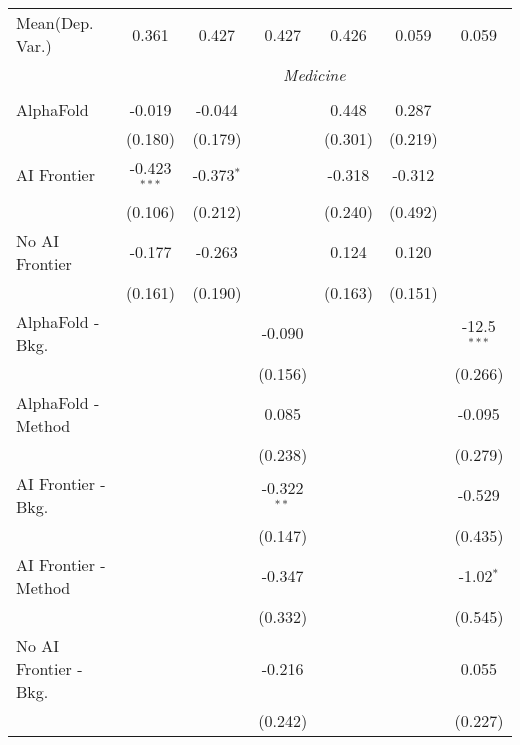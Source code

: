 \begin{tabular}{lcccccc}
Mean(Dep. Var.) & 0.361 & 0.427 & 0.427 & 0.426 & 0.059 & 0.059 \\
 & \multicolumn{6}{c}{\textit{Medicine}} \\ \\
   AlphaFold               & -0.019         & -0.044       &               & 0.448   & 0.287   &   \\   
                           & (0.180)        & (0.179)      &               & (0.301) & (0.219) &   \\   
   AI Frontier             & -0.423$^{***}$ & -0.373$^{*}$ &               & -0.318  & -0.312  &   \\   
                           & (0.106)        & (0.212)      &               & (0.240) & (0.492) &   \\   
   No AI Frontier          & -0.177         & -0.263       &               & 0.124   & 0.120   &   \\   
                           & (0.161)        & (0.190)      &               & (0.163) & (0.151) &   \\   
   AlphaFold - Bkg.        &                &              & -0.090        &         &         & -12.5$^{***}$\\   
                           &                &              & (0.156)       &         &         & (0.266)\\   
   AlphaFold - Method      &                &              & 0.085         &         &         & -0.095\\   
                           &                &              & (0.238)       &         &         & (0.279)\\   
   AI Frontier - Bkg.      &                &              & -0.322$^{**}$ &         &         & -0.529\\   
                           &                &              & (0.147)       &         &         & (0.435)\\   
   AI Frontier - Method    &                &              & -0.347        &         &         & -1.02$^{*}$\\   
                           &                &              & (0.332)       &         &         & (0.545)\\   
   No AI Frontier - Bkg.   &                &              & -0.216        &         &         & 0.055\\   
                           &                &              & (0.242)       &         &         & (0.227)\\   

\end{tabular}
